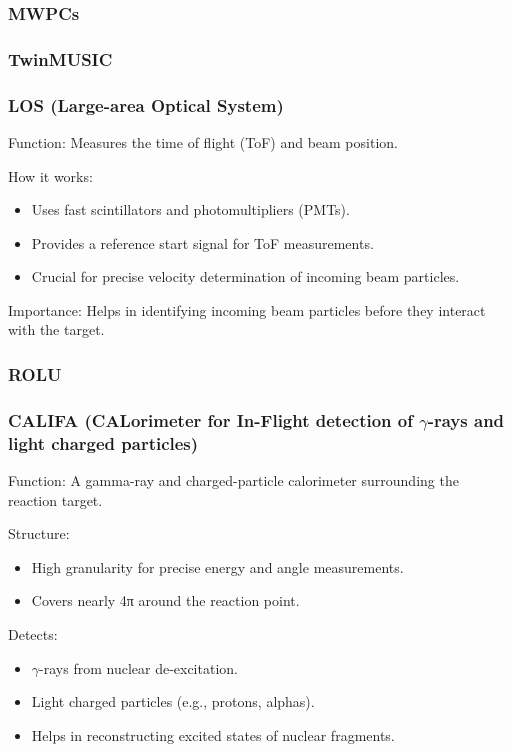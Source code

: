 \subsubsection{MWPCs}

\subsubsection{TwinMUSIC}

\subsubsection{LOS (Large-area Optical System)}

Function: Measures the time of flight (ToF) and beam position.

How it works:

\begin{itemize}
	\item Uses fast scintillators and photomultipliers (PMTs).
	\item Provides a reference start signal for ToF measurements.
	\item Crucial for precise velocity determination of incoming beam particles.
\end{itemize}

Importance: Helps in identifying incoming beam particles before they interact with the target.


\subsubsection{ROLU}

\subsubsection{CALIFA (CALorimeter for In-Flight detection of $\gamma$-rays and light charged particles)}

Function: A gamma-ray and charged-particle calorimeter surrounding the reaction target.

Structure:

\begin{itemize}
	\item High granularity for precise energy and angle measurements.
	\item Covers nearly 4π around the reaction point.
\end{itemize}


Detects:

\begin{itemize}
	\item $\gamma$-rays from nuclear de-excitation.
	\item Light charged particles (e.g., protons, alphas).
	\item Helps in reconstructing excited states of nuclear fragments.
\end{itemize}

